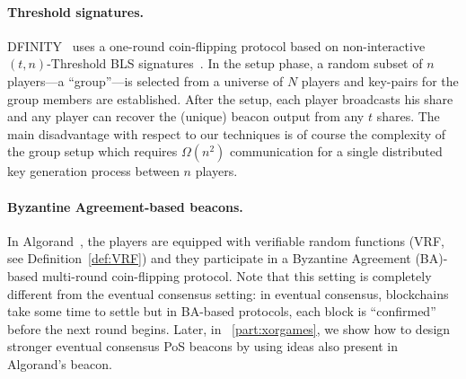 \paragraph{Threshold signatures.}
DFINITY~\cite{Dfinity} uses a one-round coin-flipping protocol based
on non-interactive $(t,n)$-Threshold BLS signatures~\cite{BLS}. 
In the setup phase, a random subset of $n$
players---a ``group''---is selected from a universe of $N$
players  
and 
key-pairs for the group members are established. 
After the setup, 
each player broadcasts his share 
and any player can
recover the (unique) beacon output from any $t$ shares.
%
The main disadvantage with respect to our techniques is of course
the complexity of the group setup which requires $\Omega(n^2)$ communication
for a single distributed key generation process between $n$ players.



\paragraph{Byzantine Agreement-based beacons.} 
In Algorand~\cite{Algorand}, the players are equipped with verifiable
random functions (VRF, see Definition~\ref{def:VRF}) 
and they participate in a Byzantine Agreement (BA)-based multi-round
coin-flipping protocol. 
Note that this setting is completely different from 
the eventual consensus setting: 
in eventual consensus, blockchains take some time to settle 
but in BA-based protocols, each block is ``confirmed'' before the next round begins. 
Later, in \Section~\ref{part:xorgames}, 
we show how to design stronger eventual consensus PoS beacons 
by using ideas also present in Algorand's beacon.

